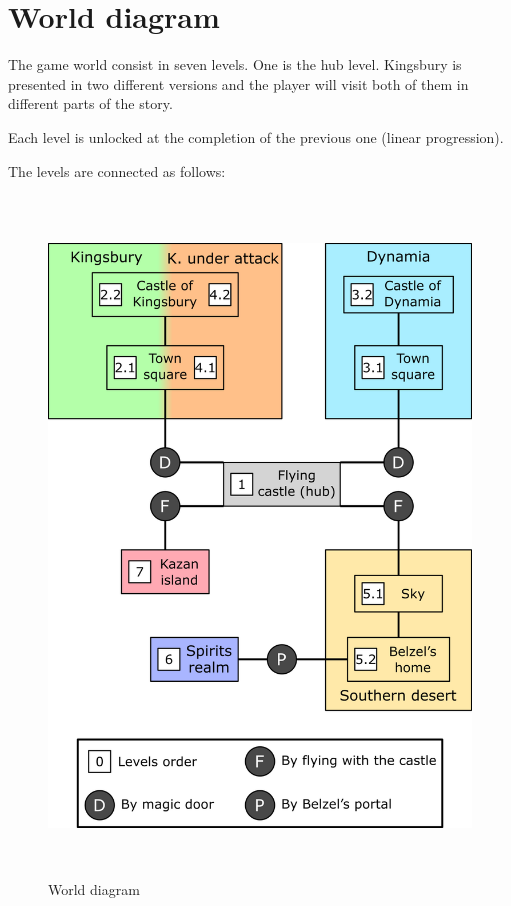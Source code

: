 \pagebreak %

\section{World diagram}

The game world consist in seven levels. One is the hub level. Kingsbury is presented in two different versions and the player will visit both of them in different parts of the story.

Each level is unlocked at the completion of the previous one (linear progression).

The levels are connected as follows:

\begin{figure}[H]
  \centering
  \includegraphics[height=18cm]{Images/Diagrams/worldDiagram}
  \caption{World diagram}
\end{figure}
